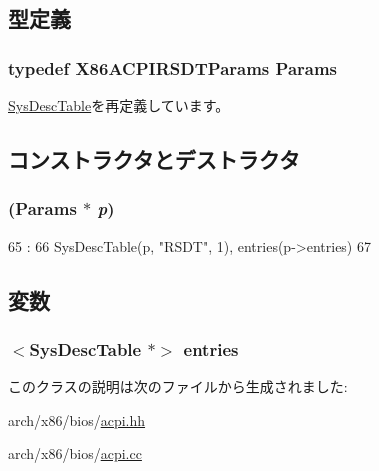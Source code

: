 \subsection{型定義}
\hypertarget{classX86ISA_1_1ACPI_1_1RSDT_a1a611568d222cb930a3203f6cceb698a}{
\subsubsection[{Params}]{\setlength{\rightskip}{0pt plus 5cm}typedef X86ACPIRSDTParams {\bf Params}}}
\label{classX86ISA_1_1ACPI_1_1RSDT_a1a611568d222cb930a3203f6cceb698a}


\hyperlink{classX86ISA_1_1ACPI_1_1SysDescTable_ad7d44b54d0c12bc9cfd0eea8156c47ba}{SysDescTable}を再定義しています。

\subsection{コンストラクタとデストラクタ}
\hypertarget{classX86ISA_1_1ACPI_1_1RSDT_adededd505de0d17df723f9ccaf5b4562}{
\subsubsection[{RSDT}]{ ({\bf Params} $\ast$ {\em p})}}
\label{classX86ISA_1_1ACPI_1_1RSDT_adededd505de0d17df723f9ccaf5b4562}



\begin{DoxyCode}
65                               :
66     SysDescTable(p, "RSDT", 1), entries(p->entries)
67 {}

\end{DoxyCode}


\subsection{変数}
\hypertarget{classX86ISA_1_1ACPI_1_1RSDT_aff927a83490471e964eaa7934ab31edf}{
\subsubsection[{entries}]{$<${\bf SysDescTable} $\ast$$>$ {\bf entries}}}
\label{classX86ISA_1_1ACPI_1_1RSDT_aff927a83490471e964eaa7934ab31edf}


このクラスの説明は次のファイルから生成されました:\begin{DoxyCompactItemize}
\item 
arch/x86/bios/\hyperlink{acpi_8hh}{acpi.hh}\item 
arch/x86/bios/\hyperlink{acpi_8cc}{acpi.cc}\end{DoxyCompactItemize}
